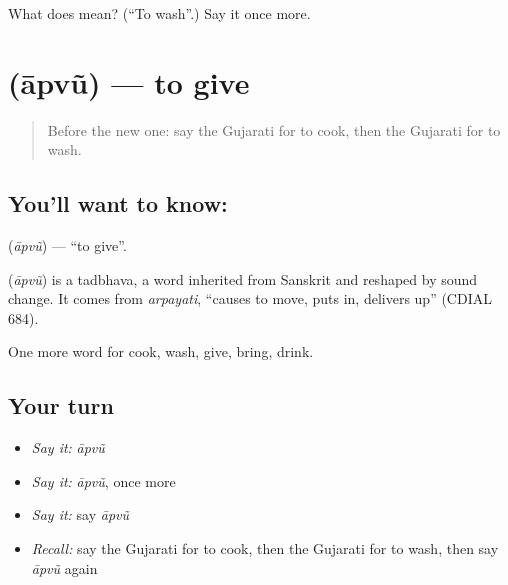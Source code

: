 \begin{tcolorbox}[breakable,colback=teal!4,colframe=teal!35!black,title={Before you move on}]
What does  mean? (\textquotedblleft{}To wash\textquotedblright{}.) Say it once more.
\end{tcolorbox}
\section[\texorpdfstring{\gu{આપવું} (āpvũ)}{આપવું (āpvũ)}]{ (āpvũ) — to give}

\label{lesson:GU-C55-aapvu}



\begin{quote}
Before the new one: say the Gujarati for to cook, then the Gujarati for to wash.
\end{quote}

\subsection*{You'll want to know: }
\textbf{} (\emph{āpvũ}) — \textquotedblleft{}to give\textquotedblright{}.

\begin{cousinweb}
\textbf{} (\emph{āpvũ}) is a tadbhava, a word inherited from Sanskrit and reshaped by sound change. It comes from \emph{arpayati}, \textquotedblleft{}causes to move, puts in, delivers up\textquotedblright{} (CDIAL 684).
\end{cousinweb}

\begin{grammarlens}[title={What you've built}]
One more word for cook, wash, give, bring, drink.
\end{grammarlens}

\subsection*{Your turn}
\begin{itemize}
\raggedright
  \item \emph{Say it:} \emph{āpvũ}
  \item \emph{Say it:} \emph{āpvũ}, once more
  \item \emph{Say it:} say \emph{āpvũ}
  \item \emph{Recall:} say the Gujarati for to cook, then the Gujarati for to wash, then say \emph{āpvũ} again
\end{itemize}

